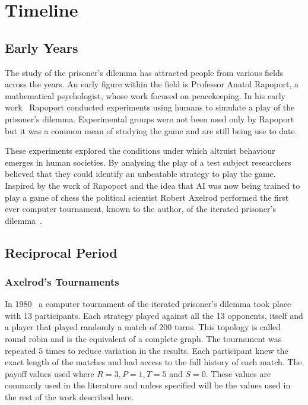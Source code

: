 \documentclass{article}
\begin{document}
\section{Timeline}\label{section:timeline}

\subsection{Early Years}
The study of the prisoner's dilemma has attracted people from various fields
across the years. An early figure within the field is Professor Anatol Rapoport,
a mathematical psychologist, whose work focused on peacekeeping.
In his early work~\cite{rapoport1965} Rapoport conducted experiments using humans
to simulate a play of the prisoner's dilemma. Experimental groups were not been
used only by Rapoport but it was a common mean of studying the game
\cite{Evans1966, Gallo1968, Lutzker1961, Mack1971, Sensenig1972} and are still
being use to date. %

These experiments explored the conditions under which altruist behaviour emerges
in human societies. By analysing the play of a test subject researchers believed
that they could identify an unbeatable strategy to play the game. Inspired by 
the work of Rapoport and the idea that AI was now being trained to play a 
game of chess the political scientist Robert Axelrod performed
the first ever computer tournament, known to the author, of the iterated 
prisoner's dilemma~\cite{axelrod2012, Axelrod1981}.

\subsection{Reciprocal Period}\label{subsection:reciprocal}

\subsubsection{Axelrod's Tournaments}\label{subsection:axelrods_tournament}

In 1980~\cite{axelrod1980a} a computer tournament of the iterated prisoner's
dilemma took place with 13 participants. Each strategy played against all the
13 opponents, itself and a player that played randomly a match of 200 turns. This
topology is called round robin and is the equivalent of a complete graph. 
The tournament was repeated \(5\) times to
reduce variation in the results. Each participant knew the exact length of the
matches and had access to the full history of each match. The payoff values
used where \(R=3, P=1, T=5\) and \(S=0\). These values are commonly used in the
literature and unless specified will be the values used in the rest of the work
described here.
\end{document}
